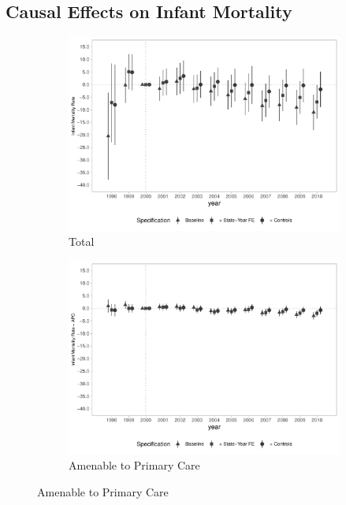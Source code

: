 \subsection{Causal Effects on Infant Mortality}




\begin{figure}[h]
    \begin{center}
    \caption{Causal Effects on Infant Mortality Rates}\label{fig:imr1}
    \begin{subfigure}{0.32\textwidth}
        \caption{\scriptsize Total}\label{fig:imr1_a}
        \centering
        \includegraphics[width=\textwidth]{plots/IMR/tx_mi_dist_ec29_baseline_dist_ec29_baseline_full.pdf}
    \end{subfigure}
    \begin{subfigure}{0.32\textwidth}
        \centering
        \caption{\scriptsize Amenable to Primary Care}\label{fig:imr1_b}
        \includegraphics[width=\textwidth]{plots/IMR/tx_mi_icsap_dist_ec29_baseline_dist_ec29_baseline_full.pdf}

\end{subfigure}
\end{center}
\end{figure}
